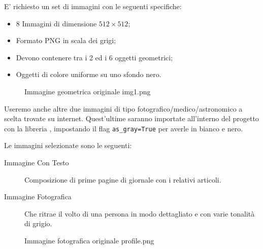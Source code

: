 E' richiesto un set di immagini con le seguenti specifiche: 
\begin{itemize}
    \item 8 Immagini di dimensione $512 \times 512$;
    \item Formato PNG in scala dei grigi;
    \item Devono contenere tra i 2 ed i 6 oggetti geometrici;
    \item Oggetti di colore uniforme su uno sfondo nero.
\end{itemize}

\begin{figure}
    \graphicspath{{./download (3).png}}
    \caption{Immagine geometrica originale img1.png}
    \label{fig:img1}
\end{figure}

Useremo anche altre due immagini di tipo fotografico/medico/astronomico a scelta trovate su internet.
Quest'ultime saranno importate all'interno del progetto con la libreria , impostando il flag \verb|as_gray=True| per averle in bianco e nero.

Le immagini selezionate sono le seguenti:
\begin{description}
    \item[Immagine Con Testo] Composizione di prime pagine di giornale con i relativi articoli.
    \item[Immagine Fotografica] Che ritrae il volto di una persona in modo dettagliato e con varie tonalità di grigio.
\end{description}

\begin{figure}
    \graphicspath{{./download (2).png}}
    \caption{Immagine fotografica originale profile.png}
    \label{fig:profile}
\end{figure}
